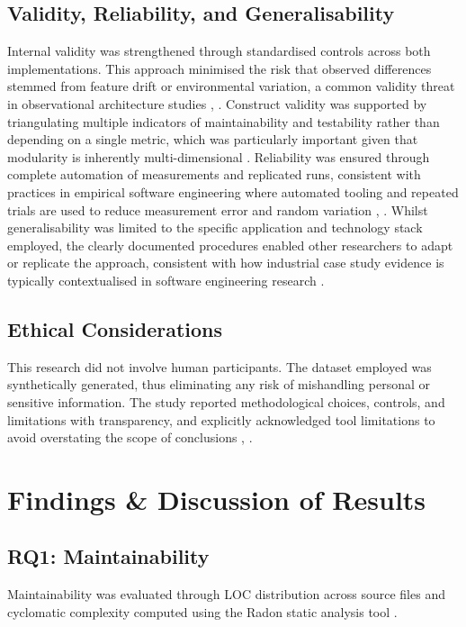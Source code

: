 ﻿\documentclass[conference]{IEEEtran}
\begin{document}
\subsection{Validity, Reliability, and Generalisability}
Internal validity was strengthened through standardised controls across both implementations. This approach minimised the risk that observed differences stemmed from feature drift or environmental variation, a common validity threat in observational architecture studies \cite{b3}, \cite{b6}. Construct validity was supported by triangulating multiple indicators of maintainability and testability rather than depending on a single metric, which was particularly important given that modularity is inherently multi-dimensional \cite{b4}. Reliability was ensured through complete automation of measurements and replicated runs, consistent with practices in empirical software engineering where automated tooling and repeated trials are used to reduce measurement error and random variation \cite{b4}, \cite{b7}. Whilst generalisability was limited to the specific application and technology stack employed, the clearly documented procedures enabled other researchers to adapt or replicate the approach, consistent with how industrial case study evidence is typically contextualised in software engineering research \cite{b7}.

\subsection{Ethical Considerations}
This research did not involve human participants. The dataset employed was synthetically generated, thus eliminating any risk of mishandling personal or sensitive information. The study reported methodological choices, controls, and limitations with transparency, and explicitly acknowledged tool limitations to avoid overstating the scope of conclusions \cite{b1}, \cite{b4}.

\section{Findings \& Discussion of Results}

\subsection*{RQ1: Maintainability}

Maintainability was evaluated through LOC distribution across source files and cyclomatic complexity computed using the Radon static analysis tool \cite{b4}.
\end{document}
